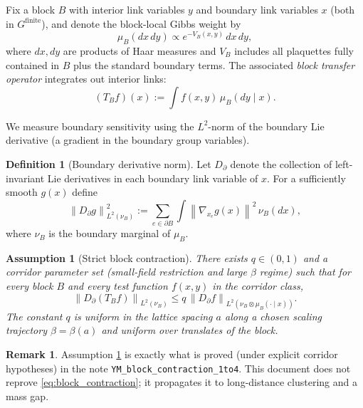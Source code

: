 \documentclass[11pt]{article}
\newtheorem{assumption}[theorem]{Assumption}
\theoremstyle{definition}
\newtheorem{definition}[theorem]{Definition}
\newtheorem{remark}[theorem]{Remark}
\newcommand{\1}{\mathbf{1}}
\newcommand{\norm}[1]{\left\lVert#1\right\rVert}
\begin{document}
Fix a block $B$ with interior link variables $y$ and boundary link variables $x$ (both in $G^{\text{finite}}$), and denote the block-local Gibbs weight by
\begin{equation}
\mu_B(dx\,dy) \propto e^{-V_B(x,y)}\,dx\,dy,
\end{equation}
where $dx,dy$ are products of Haar measures and $V_B$ includes all plaquettes fully contained in $B$ plus the standard boundary terms. The associated \emph{block transfer operator} integrates out interior links:
\begin{equation}\label{eq:Tdef}
(T_B f)(x) := \int f(x,y)\,\mu_B(dy\mid x).
\end{equation}

We measure boundary sensitivity using the $L^2$-norm of the boundary Lie derivative (a gradient in the boundary group variables).

\begin{definition}[Boundary derivative norm]
Let $D_\partial$ denote the collection of left-invariant Lie derivatives in each boundary link variable of $x$. For a sufficiently smooth $g(x)$ define
\begin{equation}
\norm{D_\partial g}_{L^2(\nu_B)}^2 := \sum_{e\in\partial B} \int \norm{\nabla_{x_e} g(x)}^2\,\nu_B(dx),
\end{equation}
where $\nu_B$ is the boundary marginal of $\mu_B$.
\end{definition}

\begin{assumption}[Strict block contraction]\label{ass:contraction}
There exists $q\in(0,1)$ and a corridor parameter set (small-field restriction and large $\beta$ regime) such that for every block $B$ and every test function $f(x,y)$ in the corridor class,
\begin{equation}\label{eq:block_contraction}
\norm{D_\partial(T_B f)}_{L^2(\nu_B)} \le q\,\norm{D_\partial f}_{L^2(\nu_B\otimes\mu_B(\cdot\mid x))}.
\end{equation}
The constant $q$ is uniform in the lattice spacing $a$ along a chosen scaling trajectory $\beta=\beta(a)$ and uniform over translates of the block.
\end{assumption}

\begin{remark}
Assumption \ref{ass:contraction} is exactly what is proved (under explicit corridor hypotheses) in the note \texttt{YM\_block\_contraction\_1to4}. This document does not reprove \eqref{eq:block_contraction}; it propagates it to long-distance clustering and a mass gap.
\end{remark}
\end{document}
